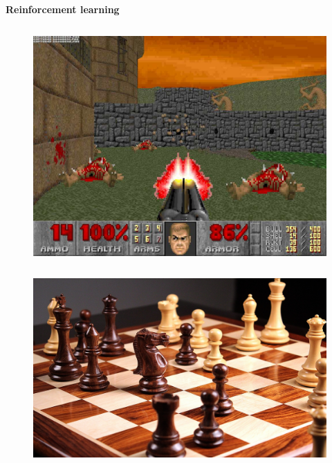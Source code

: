 \documentclass[xcolor=dvipsnames]{beamer}
\begin{document}
\begin{frame}{\bf Reinforcement learning}
\begin{columns}
\begin{column}{0.5\textwidth}
  \begin{figure}
  \includegraphics[scale=0.15]{../../pictures/doom.jpg}
  \end{figure}

\end{column}
\end{columns}

\vspace{-40pt}
\begin{figure}
\includegraphics[scale=0.05]{../../pictures/chess.jpg}
\end{figure}

\end{frame}
\end{document}
